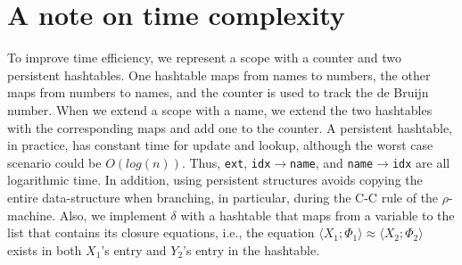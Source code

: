 \documentclass{easychair}
\newcommand{\clos}[2] {
\langle #1; #2 \rangle
}
\newcommand{\aeq}[4] {
\clos{#1}{#2} \approx \clos{#3}{#4}
}
\newcommand*{\transname}[1]{\textsc{#1}}
\begin{document}
\section{A note on time complexity}
\label{efficiency}
To improve time efficiency,
we represent a scope with a counter and two persistent
hashtables. One
hashtable maps from names to numbers, the other maps from numbers to
names, and the counter is used to track the de Bruijn number. When we
extend a scope with a name, we extend the two hashtables with the
corresponding maps and add one to the counter. A persistent
hashtable, in practice, has constant time for update and lookup,
although the worst case scenario could be $O(log(n))$. Thus,
\texttt{ext}, \texttt{idx$\rightarrow$name}, and
\texttt{name$\rightarrow$idx} are all logarithmic time. In addition,
using persistent structures avoids copying the entire data-structure
when branching, in particular, during the \transname{C-C} rule of
the $\rho$-machine.
Also, we implement $\delta$ with a hashtable that maps from a variable to
the list that contains its closure equations,
i.e., the equation $\aeq{X_1}{\Phi_1}{X_2}{\Phi_2}$
exists in both $X_1$'s entry and $Y_2$'s entry in the hashtable.
\end{document}
